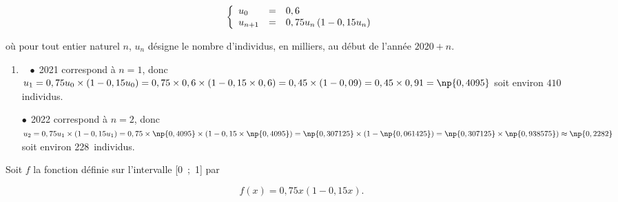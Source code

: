 \medskip









\[\left\{\begin{array}{l c l}
u_0		&=	&0,6\\
u_{n+1}	&=	&0,75 u_n\left(1 - 0,15 u_n\right)
\end{array}\right.\]

où pour tout entier naturel $n$, $u_n$ désigne le nombre d'individus, en milliers, au début de l'année $2020 + n$.

\medskip

\begin{enumerate}
\item ~
$\bullet~~$2021 correspond à $n = 1$, donc $u_1 = 0,75u_0 \times \left(1 - 0,15u_0\right) = 0,75 \times 0,6\times (1 - 0,15 \times 0,6) = 0,45 \times (1 - 0,09) = 0,45 \times0,91 = \np{0,4095}$ soit environ $410$ individus.

$\bullet~~$2022 correspond à $n = 2$, donc $u_2 = 0,75u_1 \times \left(1 - 0,15u_1\right) = 0,75 \times \np{0,4095}\times (1 - 0,15 \times \np{0,4095}) = \np{0,307125} \times (1 - \np{0,061425}) = \np{0,307125} \times \np{0,938575}) \approx \np{0,2282}$ soit environ 228~individus.

\end{enumerate}

Soit $f$ la fonction définie sur l'intervalle [0~;~1] par 

\[f(x) = 0,75x (1 - 0,15x).\]

